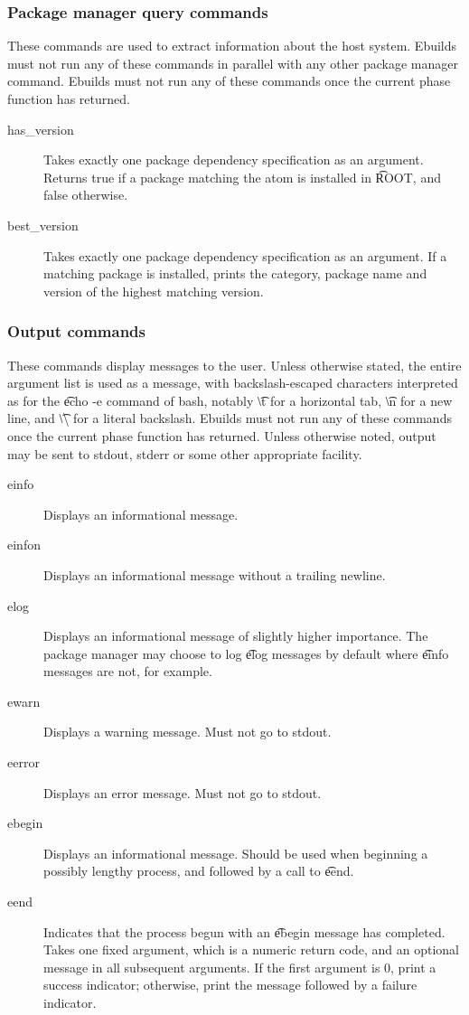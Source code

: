\subsubsection{Package manager query commands}
These commands are used to extract information about the host system. Ebuilds must not run any of
these commands in parallel with any other package manager command. Ebuilds must not run any of
these commands once the current phase function has returned.
\begin{description}
\item[has\_version] Takes exactly one package dependency specification as an argument. Returns
    true if a package matching the atom is installed in \t{ROOT}, and false otherwise.
\item[best\_version] Takes exactly one package dependency specification as an argument. If a
    matching package is installed, prints the category, package name and version of the highest
    matching version.
\end{description}

\subsubsection{Output commands}
These commands display messages to the user. Unless otherwise stated, the entire argument list is
used as a message, with backslash-escaped characters interpreted as for the \t{echo -e} command of
bash, notably \t{\textbackslash t} for a horizontal tab, \t{\textbackslash n} for a new line, and
\t{\textbackslash\textbackslash} for a literal backslash. Ebuilds must not run any of these commands
once the current phase function has returned. Unless otherwise noted, output may be sent to stdout,
stderr or some other appropriate facility.
\begin{description}
\item[einfo] Displays an informational message.
\item[einfon] Displays an informational message without a trailing newline.
\item[elog] Displays an informational message of slightly higher importance. The package
    manager may choose to log \t{elog} messages by default where \t{einfo} messages are not, for
    example.
\item[ewarn] Displays a warning message. Must not go to stdout.
\item[eerror] Displays an error message. Must not go to stdout.
\item[ebegin] Displays an informational message. Should be used when beginning a possibly
    lengthy process, and followed by a call to \t{eend}.
\item[eend] Indicates that the process begun with an \t{ebegin} message has completed. Takes one
    fixed argument, which is a numeric return code, and an optional message in all subsequent
    arguments.  If the first argument is 0, print a success indicator; otherwise, print the message
    followed by a failure indicator.
\end{description}

